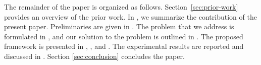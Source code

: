The remainder of the paper is organized as follows. Section~\ref{sec:prior-work}
provides an overview of the prior work. In , we summarize the
contribution of the present paper. Preliminaries are given in
. The problem that we address is formulated in
, and our solution to the problem is outlined in
. The proposed framework is presented in ,
, and . The experimental results are reported
and discussed in . Section \ref{sec:conclusion}
concludes the paper.
